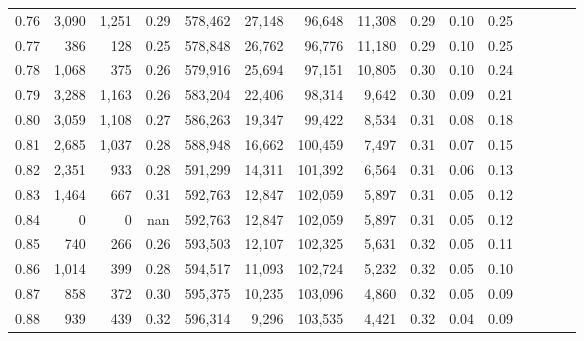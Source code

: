 \begin{tabular}{rrrcrrrrrrrrrrr}
0.76 &   3,090 &  1,251 &                                       0.29 &  578,462 &   27,148 &   96,648 &   11,308 &  0.29 &  0.10 &                         0.25 \\
0.77 &     386 &    128 &                                       0.25 &  578,848 &   26,762 &   96,776 &   11,180 &  0.29 &  0.10 &                         0.25 \\
0.78 &   1,068 &    375 &                                       0.26 &  579,916 &   25,694 &   97,151 &   10,805 &  0.30 &  0.10 &                         0.24 \\
0.79 &   3,288 &  1,163 &                                       0.26 &  583,204 &   22,406 &   98,314 &    9,642 &  0.30 &  0.09 &                         0.21 \\
0.80 &   3,059 &  1,108 &                                       0.27 &  586,263 &   19,347 &   99,422 &    8,534 &  0.31 &  0.08 &                         0.18 \\
0.81 &   2,685 &  1,037 &                                       0.28 &  588,948 &   16,662 &  100,459 &    7,497 &  0.31 &  0.07 &                         0.15 \\
0.82 &   2,351 &    933 &                                       0.28 &  591,299 &   14,311 &  101,392 &    6,564 &  0.31 &  0.06 &                         0.13 \\
0.83 &   1,464 &    667 &                                       0.31 &  592,763 &   12,847 &  102,059 &    5,897 &  0.31 &  0.05 &                         0.12 \\
0.84 &       0 &      0 &                                        nan &  592,763 &   12,847 &  102,059 &    5,897 &  0.31 &  0.05 &                         0.12 \\
0.85 &     740 &    266 &                                       0.26 &  593,503 &   12,107 &  102,325 &    5,631 &  0.32 &  0.05 &                         0.11 \\
0.86 &   1,014 &    399 &                                       0.28 &  594,517 &   11,093 &  102,724 &    5,232 &  0.32 &  0.05 &                         0.10 \\
0.87 &     858 &    372 &                                       0.30 &  595,375 &   10,235 &  103,096 &    4,860 &  0.32 &  0.05 &                         0.09 \\
0.88 &     939 &    439 &                                       0.32 &  596,314 &    9,296 &  103,535 &    4,421 &  0.32 &  0.04 &                         0.09 \\

\end{tabular}
